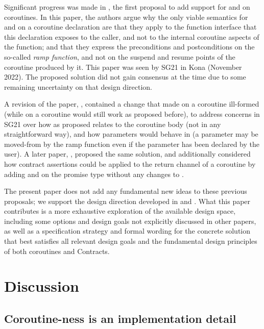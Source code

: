Significant progress was made in \cite{P2957R0},  the first proposal to add support for  and  on coroutines. In this paper, the authors argue why the only viable semantics for  and  on a coroutine declaration are that they apply to the function interface that this declaration exposes to the caller, and not to the internal coroutine aspects of the function; and that they express the preconditions and postconditions on the so-called \emph{ramp function}, and not on the suspend and resume points of the coroutine produced by it. This paper was seen by SG21 in Kona (November 2022). The proposed solution did not gain consensus at the time due to some remaining uncertainty on that design direction. 

A revision of the paper, \cite{P2957R1}, contained a change that made  on a coroutine ill-formed (while  on a coroutine would still work as proposed before), to address concerns in SG21 over how  as proposed relates to the coroutine body (not in any straightforward way), and how parameters would behave in  (a parameter may be moved-from by the ramp function even if the parameter has been declared  by the user). A later paper, \cite{P3251R0}, proposed the same solution, and additionally considered how contract assertions could be applied to the return channel of a coroutine by adding  and  on the promise type without any changes to \cite{P2900R8}.

The present paper does not add any fundamental new ideas to these previous proposals; we support the design direction developed in \cite{P2957R0} and \cite{P2957R1}. What this paper contributes is a more exhaustive exploration of the available design space, including some options and design goals not explicitly discussed in other papers, as well as a specification strategy and formal wording for the concrete solution that best satisfies all relevant design goals and the fundamental design principles of both coroutines and Contracts.

\section{Discussion}

\subsection{Coroutine-ness is an implementation detail}
\label{impldetail}

